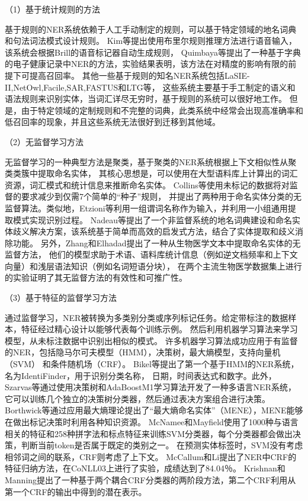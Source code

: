 （1）基于统计规则的方法

基于规则的NER系统依赖于人工手动制定的规则，可以基于特定领域的地名词典和句法词法模式设计规则。
Kim等提出使用布里尔规则推理方法进行语音输入，该系统会根据Brill的语音标记器自动生成规则\cite{kim2000rule}，
Quimbaya等提出了一种基于字典的电子健康记录中NER的方法\cite{pomares2016named}，实验结果表明，该方法在对精度的影响有限的前提下可提高召回率。
其他一些基于规则的知名NER系统包括LaSIE-II,NetOwl,Facile,SAR,FASTUS和LTG等，
这些系统主要基于手工制定的语义和语法规则来识别实体，当词汇详尽无穷时，基于规则的系统可以很好地工作。
但是，由于特定领域的定制规则和不完整的词典，此类系统中经常会出现高准确率和低召回率的现象，并且这些系统无法很好到迁移到其他域。

（2）无监督学习方法

无监督学习的一种典型方法是聚类，基于聚类的NER系统根据上下文相似性从聚类类簇中提取命名实体，
其核心思想是，可以使用在大型语料库上计算出的词汇资源，词汇模式和统计信息来推断命名实体。 
Collins等使用未标记的数据将对监督的要求减少到仅需7个简单的“种子”规则\cite{collins1999unsupervised}，
并提出了两种用于命名实体分类的无监督算法。类似地，Etzioni等利用一组谓词名称作为输入，并利用一小组通用提取模式实现识别过程\cite{etzioni2005unsupervised}。 
Nadeau等提出了一个非监督系统的地名词典建设和命名实体歧义解决方案，该系统基于简单而高效的启发式方法，结合了实体提取和歧义消除功能\cite{nadeau2006unsupervised}。
另外，Zhang和Elhadad提出了一种从生物医学文本中提取命名实体的无监督方法\cite{zhang2013unsupervised}，
他们的模型求助于术语、语料库统计信息（例如逆文档频率和上下文向量）和浅层语法知识（例如名词短语分块），
在两个主流生物医学数据集上进行的实验证明了其无监督方法的有效性和可推广性。

（3）基于特征的监督学习方法

通过监督学习，NER被转换为多类别分类或序列标记任务。给定带标注的数据样本，特征经过精心设计以能够代表每个训练示例。
然后利用机器学习算法来学习模型，从未标注数据中识别出相似的模式。
许多机器学习算法成功应用于有监督的NER，包括隐马尔可夫模型（HMM），决策树，最大熵模型，支持向量机（SVM）
和条件随机场（CRF）。 Bikel等提出了第一个基于HMM的NER系统，名为IdentiFinder，用于识别分类名称，
日期，时间表达式和数字\cite{bikel1998nymble,bikel1999algorithm}。此外，Szarvas等通过使用决策树和AdaBoostM1学习算法开发了一种多语言NER系统，
它可以训练几个独立的决策树分类器，然后通过表决方案组合进行决策\cite{szarvas2006multilingual}。 
Borthwick等通过应用最大熵理论提出了“最大熵命名实体”（MENE），MENE能够在做出标记决策时利用各种知识资源。
 McNamee和Mayfield使用了1000种与语言相关的特征和258种拼字法和标点特征来训练SVM分类器，每个分类器都会做出决策，判断当前token是否属于既定的类别之一\cite{mcnamee2002entity}。
 在预测实体标签时，SVM没有考虑相邻词之间的联系，CRF则考虑了上下文。 
 McCallum和Li提出了NER中CRF的特征归纳方法，在CoNLL03上进行了实验，成绩达到了84.04％\cite{mccallum2003early}。 
 Krishnan和Manning提出了一种基于两个耦合CRF分类器的两阶段方法，第二个CRF利用从第一个CRF的输出中得到的潜在表示\cite{krishnan2006effective}。

